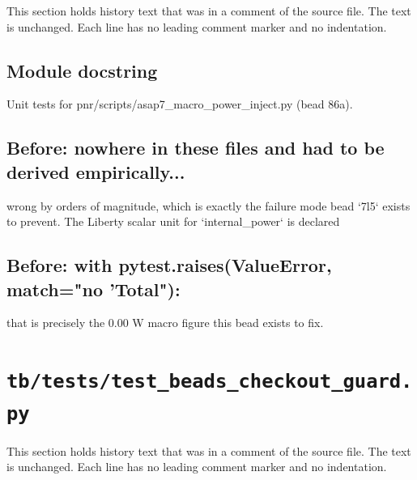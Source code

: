 This section holds history text that was in a comment of the source file. The text is unchanged. Each line has no leading comment marker and no indentation.

\begin{record}

\subsection*{Module docstring}

\begin{textblock}
Unit tests for pnr/scripts/asap7_macro_power_inject.py (bead 86a).
\end{textblock}

\subsection*{Before: nowhere in these files and had to be derived empirically...}

\begin{textblock}
wrong by orders of magnitude, which is exactly the failure mode bead `7l5`
exists to prevent. The Liberty scalar unit for `internal_power` is declared
\end{textblock}

\subsection*{Before: with pytest.raises(ValueError, match="no 'Total"):}

\begin{textblock}
that is precisely the 0.00 W macro figure this bead exists to fix.
\end{textblock}

\end{record}

\section{\texttt{tb/tests/test\_beads\_checkout\_guard.py}}\label{cr:suite:test-beads-checkout-guard}

This section holds history text that was in a comment of the source file. The text is unchanged. Each line has no leading comment marker and no indentation.

